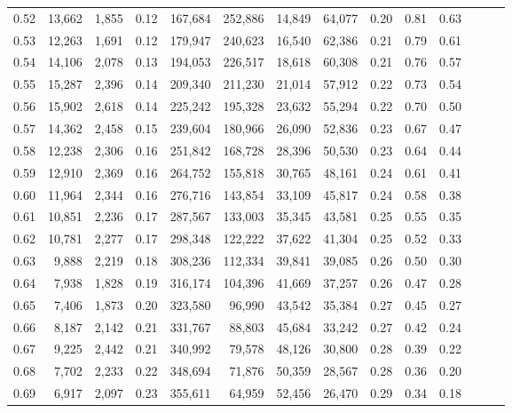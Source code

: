 \begin{tabular}{rrrrrrrrrrrrrr}
0.52 &  13,662 &  1,855 &  0.12 &  167,684 &  252,886 &  14,849 &  64,077 &  0.20 &  0.81 &      0.63 \\
0.53 &  12,263 &  1,691 &  0.12 &  179,947 &  240,623 &  16,540 &  62,386 &  0.21 &  0.79 &      0.61 \\
0.54 &  14,106 &  2,078 &  0.13 &  194,053 &  226,517 &  18,618 &  60,308 &  0.21 &  0.76 &      0.57 \\
0.55 &  15,287 &  2,396 &  0.14 &  209,340 &  211,230 &  21,014 &  57,912 &  0.22 &  0.73 &      0.54 \\
0.56 &  15,902 &  2,618 &  0.14 &  225,242 &  195,328 &  23,632 &  55,294 &  0.22 &  0.70 &      0.50 \\
0.57 &  14,362 &  2,458 &  0.15 &  239,604 &  180,966 &  26,090 &  52,836 &  0.23 &  0.67 &      0.47 \\
0.58 &  12,238 &  2,306 &  0.16 &  251,842 &  168,728 &  28,396 &  50,530 &  0.23 &  0.64 &      0.44 \\
0.59 &  12,910 &  2,369 &  0.16 &  264,752 &  155,818 &  30,765 &  48,161 &  0.24 &  0.61 &      0.41 \\
0.60 &  11,964 &  2,344 &  0.16 &  276,716 &  143,854 &  33,109 &  45,817 &  0.24 &  0.58 &      0.38 \\
0.61 &  10,851 &  2,236 &  0.17 &  287,567 &  133,003 &  35,345 &  43,581 &  0.25 &  0.55 &      0.35 \\
0.62 &  10,781 &  2,277 &  0.17 &  298,348 &  122,222 &  37,622 &  41,304 &  0.25 &  0.52 &      0.33 \\
0.63 &   9,888 &  2,219 &  0.18 &  308,236 &  112,334 &  39,841 &  39,085 &  0.26 &  0.50 &      0.30 \\
0.64 &   7,938 &  1,828 &  0.19 &  316,174 &  104,396 &  41,669 &  37,257 &  0.26 &  0.47 &      0.28 \\
0.65 &   7,406 &  1,873 &  0.20 &  323,580 &   96,990 &  43,542 &  35,384 &  0.27 &  0.45 &      0.27 \\
0.66 &   8,187 &  2,142 &  0.21 &  331,767 &   88,803 &  45,684 &  33,242 &  0.27 &  0.42 &      0.24 \\
0.67 &   9,225 &  2,442 &  0.21 &  340,992 &   79,578 &  48,126 &  30,800 &  0.28 &  0.39 &      0.22 \\
0.68 &   7,702 &  2,233 &  0.22 &  348,694 &   71,876 &  50,359 &  28,567 &  0.28 &  0.36 &      0.20 \\
0.69 &   6,917 &  2,097 &  0.23 &  355,611 &   64,959 &  52,456 &  26,470 &  0.29 &  0.34 &      0.18 \\

\end{tabular}
